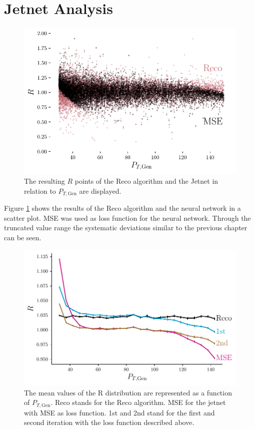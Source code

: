 \documentclass[12pt, a4paper]{thesis}
\begin{document}
\section{Jetnet Analysis}
\label{sec:org03235a3}

\begin{figure}[H]
  \centering
  \includegraphics[width=.9\linewidth]{../images/jetnet_R_scatter.pdf}
  \caption{The resulting \(R\) points of the Reco algorithm and the
    Jetnet in relation to \(P_{T, \text{Gen}}\) are displayed.}
  \label{jetnet_R_scatter}
\end{figure}

Figure \ref{jetnet_R_scatter} shows the results of the Reco algorithm
and the neural network in a scatter plot. MSE was used as loss
function for the neural network. Through the truncated value range the
systematic deviations similar to the previous chapter can be seen.

 
\begin{figure}[H]
  \includegraphics[width=.9\linewidth]{../images/jetnet_R.pdf}
  \caption{The mean values of the R distribution are represented as a
    function of \(P_{T, \text{Gen}}\). Reco stands for the Reco
    algorithm. MSE for the jetnet with MSE as loss function. 1st and
    2nd stand for the first and second iteration with the loss
    function described above.}
  \label{jetnet_R}
\end{figure}
\end{document}
